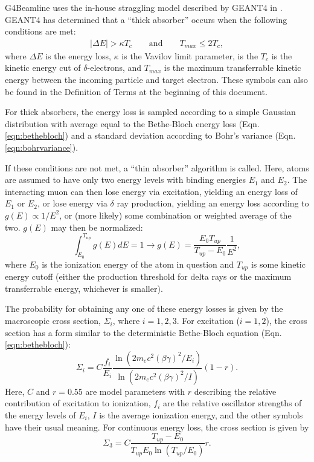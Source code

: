 \label{sec:g4blstraggling}

G4Beamline uses the in-house straggling model described by GEANT4 in \cite{geant4}.  GEANT4 has determined that a ``thick absorber'' occurs when the following conditions are met:
\begin{align}\label{eqn:G4StragglingThickTest}
|\Delta E| > \kappa T_c \qquad \text{and} \qquad T_{max} \le 2T_c,
\end{align}
where $\Delta E$ is the energy loss, $\kappa$ is the Vavilov limit parameter, is the $T_c$ is the kinetic energy cut of $\delta$-electrons, and $T_{max}$ is the maximum transferrable kinetic energy between the incoming particle and target electron. These symbols can also be found in the Definition of Terms at the beginning of this document.

For thick absorbers, the energy loss is sampled according to a simple Gaussian distribution with average equal to the Bethe-Bloch energy loss (Eqn. \ref{eqn:bethebloch}) and a standard deviation according to Bohr's variance (Eqn. \ref{eqn:bohrvariance}).

If these conditions are not met, a ``thin absorber'' algorithm is called. Here, atoms are assumed to have only two energy levels with binding energies $E_1$ and $E_2$. The interacting muon can then lose energy via excitation, yielding an energy loss of $E_1$ or $E_2$, or lose energy via $\delta$ ray production, yielding an energy loss according to $ g(E) \propto 1/E^2 $, or (more likely) some combination or weighted average of the two. $g(E)$ may then be normalized:
\begin{equation}
\int_{E_0}^{T_{up}} g(E) dE = 1 \rightarrow g(E)=\frac{E_0 T_{up}}{T_{up}-E_0}\frac{1}{E^2},
\label{eqn:G4StragglingIonization}
\end{equation}
where $E_0$ is the ionization energy of the atom in question and $T_{up}$ is some kinetic energy cutoff (either the production threshold for delta rays or the maximum transferrable energy, whichever is smaller).

The probability for obtaining any one of these energy losses is given by the macroscopic cross section, $\Sigma_i$, where $i=1,2,3$. For excitation ($i=1,2$), the cross section has a form similar to the deterministic Bethe-Bloch equation (Eqn. \ref{eqn:bethebloch}):
\begin{equation}\label{eqn:G4StragglingCrossSectionExcitation}
\Sigma_i=C\frac{f_i}{E_i}\frac{\ln(2m_e c^2(\beta\gamma)^2/E_i)}{\ln(2m_e c^2(\beta\gamma)^2/I)}(1-r).
\end{equation}
Here, $C$ and $r=0.55$ are model parameters with $r$ describing the relative contribution of excitation to ionization, $f_i$ are the relative oscillator strengths of the energy levels of $E_i$, $I$ is the average ionization energy, and the other symbols have their usual meaning. For continuous energy loss, the cross section is given by
\begin{equation}\label{eqn:G4StragglingCrossSectionIonization}
\Sigma_3=C\frac{T_{up}-E_0}{T_{up}E_0\ln(T_{up}/E_0)}r.
\end{equation}

